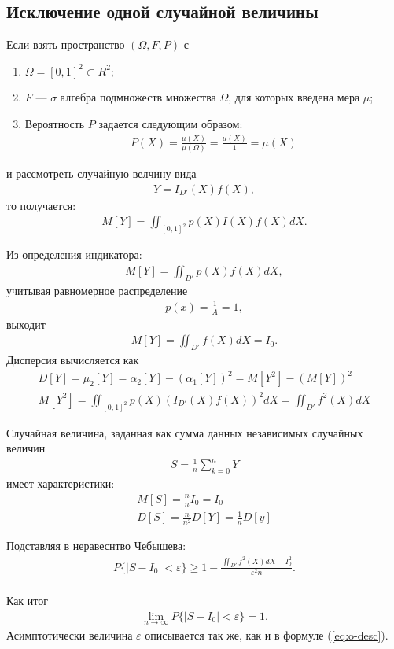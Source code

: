 \subsection{Исключение одной случайной величины}\label{method-2}
Если взять пространство \((\Omega, F, P)\) с
\begin{enumerate}
	\item \(\Omega = [0,1]^2 \subset R^2\);
	\item \(F\) --- \(\sigma\) алгебра подмножеств множества \(\Omega\), для которых введена мера \(\mu\);
	\item Вероятность \(P\) задается следующим образом:
	      \begin{align*}
		      P(X) = \frac{\mu(X)}{\mu(\Omega)} = \frac{\mu(X)}{1} = \mu(X)
	      \end{align*}
\end{enumerate}

и рассмотреть случайную велчину вида
\begin{align}
	Y = I_{D'}(X)f(X),
\end{align}
то получается:
\begin{align}
	M[Y] = \iint_{[0,1]^2} p(X) I(X) f(X) dX.
\end{align}

Из определения индикатора:
\begin{align}
	M[Y] = \iint_{D'} p(X)f(X) dX,
\end{align}
учитывая равномерное распределение
\begin{align}
	p(x) = \frac{1}{A} = 1,
\end{align}
выходит
\begin{align}
	M[Y] = \iint_{D'} f(X) dX = I_0.
\end{align}
Дисперсия вычисляется как
\begin{align}
	D[Y] = \mu_2[Y] = \alpha_2[Y] - (\alpha_1[Y])^2 = M[Y^2] - (M[Y])^2 \\
	M[Y^2] = \iint_{[0, 1]^2} p(X)(I_{D'}(X)f(X))^2 dX = \iint_{D'}f^2(X) dX
\end{align}

Случайная величина, заданная как сумма данных независимых случайных величин
\begin{align}
	S = \frac{1}{n}\sum_{k=0}^n Y
\end{align}
имеет характеристики:
\begin{align}
	M[S] = \frac{n}{n}I_0 = I_0 \\
	D[S] = \frac{n}{n^2} D[Y] = \frac{1}{n} D[y]
\end{align}

Подставляя в неравеснтво Чебышева:
\begin{align}
	P\{|S - I_0|<\varepsilon\} \geq 1 - \frac{\iint_{D'}f^2(X)dX - I_0^2}{\varepsilon^2 n}. \\
\end{align}

Как итог
\begin{align}
	\lim_{n\to\infty}P\{|S - I_0|<\varepsilon\} = 1.
\end{align}
Асимптотически величина \(\varepsilon\) описывается так же, как и в формуле (\ref{eq:o-desc}).

